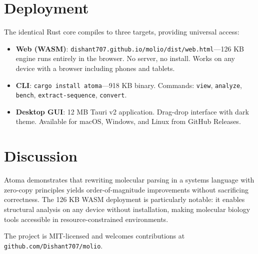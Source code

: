 \documentclass[11pt,a4paper]{article}
\begin{document}
\section{Deployment}

The identical Rust core compiles to three targets, providing universal access:

\begin{itemize}[leftmargin=*]
  \item \textbf{Web (WASM)}: \texttt{dishant707.github.io/molio/dist/web.html}---126 KB engine runs entirely in the browser. No server, no install. Works on any device with a browser including phones and tablets.
  \item \textbf{CLI}: \texttt{cargo install atoma}---918 KB binary. Commands: \texttt{view}, \texttt{analyze}, \texttt{bench}, \texttt{extract-sequence}, \texttt{convert}.
  \item \textbf{Desktop GUI}: 12 MB Tauri v2 application. Drag-drop interface with dark theme. Available for macOS, Windows, and Linux from GitHub Releases.
\end{itemize}

\section*{Discussion}

Atoma demonstrates that rewriting molecular parsing in a systems language with zero-copy principles yields order-of-magnitude improvements without sacrificing correctness. The 126 KB WASM deployment is particularly notable: it enables structural analysis on any device without installation, making molecular biology tools accessible in resource-constrained environments.

The project is MIT-licensed and welcomes contributions at \texttt{github.com/Dishant707/molio}.
\end{document}
